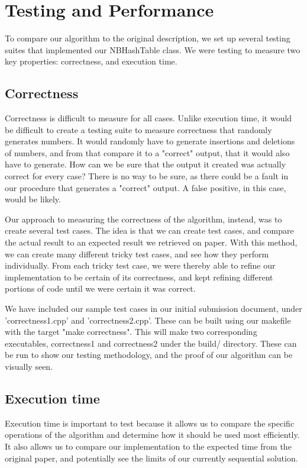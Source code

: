 \documentclass[journal]{IEEEtran}
\begin{document}
\section{Testing and Performance}

To compare our algorithm to the original description, we set up several testing suites that implemented our NBHashTable class. We were testing to measure two key properties: correctness, and execution time.

\subsection{Correctness}

Correctness is difficult to measure for all cases. Unlike execution time, it would be difficult to create a testing suite to measure correctness that randomly generates numbers. It would randomly have to generate insertions and deletions of numbers, and from that compare it to a "correct" output, that it would also have to generate. How can we be sure that the output it created was actually correct for every case? There is no way to be sure, as there could be a fault in our procedure that generates a "correct" output. A false positive, in this case, would be likely.

Our approach to measuring the correctness of the algorithm, instead, was to create several test cases. The idea is that we can create test cases, and compare the actual result to an expected result we retrieved on paper. With this method, we can create many different tricky test cases, and see how they perform individually. From each tricky test case, we were thereby able to refine our implementation to be certain of its correctness, and kept refining different portions of code until we were certain it was correct.

We have included our sample test cases in our initial submission document, under 'correctness1.cpp' and 'correctness2.cpp'. These can be built using our makefile with the target "make correctness". This will make two corresponding executables, correctness1 and correctness2 under the build/ directory. These can be run to show our testing methodology, and the proof of our algorithm can be visually seen.

\subsection{Execution time}

Execution time is important to test because it allows us to compare the specific operations of the algorithm and determine how it should be used most efficiently. It also allows us to compare our implementation to the expected time from the original paper, and potentially see the limits of our currently sequential solution.
\end{document}
